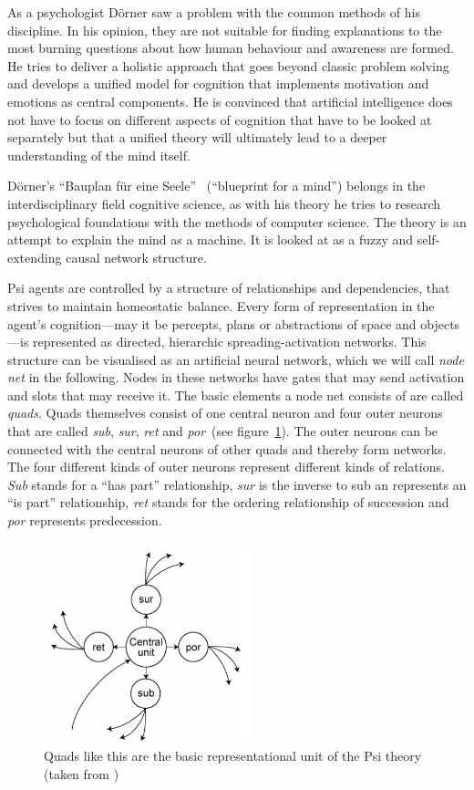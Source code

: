 As a psychologist Dörner saw a problem with the common methods of his discipline. In his opinion, they are not suitable for finding explanations to the most burning questions about how human behaviour and awareness are formed. He tries to deliver a holistic approach that goes beyond classic problem solving and develops a unified model for cognition that implements motivation and emotions as central components. He is convinced that artificial intelligence does not have to focus on different aspects of cognition that have to be looked at separately but that a unified theory will ultimately lead to a deeper understanding of the mind itself.
    
Dörner's ``Bauplan für eine Seele''~\cite{Doerner1998} (``blueprint for a mind'') belongs in the interdisciplinary field cognitive science, as with his theory he tries to research psychological foundations with the methods of computer science. The theory is an attempt to explain the mind as a machine. It is looked at as a fuzzy and self-extending causal network structure. 

Psi agents are controlled by a structure of relationships and dependencies, that strives to maintain homeostatic balance. Every form of representation in the agent's cognition---may it be percepts, plans or abstractions of space and objects---is represented as directed, hierarchic spreading-activation networks. This structure can be visualised as an artificial neural network, which we will call \emph{node net} in the following. Nodes in these networks have gates that may send activation and slots that may receive it. The basic elements a node net consists of are called \emph{quads}. Quads themselves consist of one central neuron and four outer neurons that are called \emph{sub}, \emph{sur}, \emph{ret} and \emph{por}~(see figure~\ref{quad}). The outer neurons can be connected with the central neurons of other quads and thereby form networks. The four different kinds of outer neurons represent different kinds of relations. \emph{Sub} stands for a ``has part'' relationship, \emph{sur} is the inverse to sub an represents an ``is part'' relationship, \emph{ret} stands for the ordering relationship of succession and \emph{por} represents predecession.

\begin{figure}[h]
  \centering
    \includegraphics[width=6cm]{graphics/quad}
  \caption{Quads like this are the basic representational unit of the Psi theory (taken from \cite{Bach:2009:PSI:1611304})}
  \label{quad}
\end{figure}

